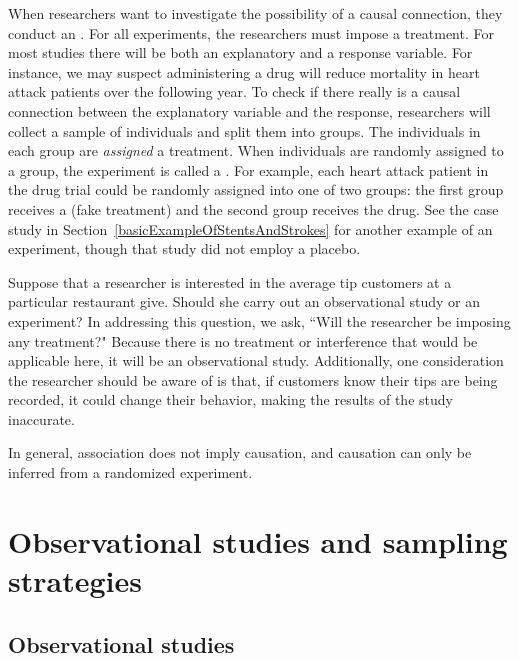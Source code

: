 When researchers want to investigate the possibility of a causal connection, they conduct an . For all experiments, the researchers must impose a treatment. For most studies there will be both an explanatory and a response variable. For instance, we may suspect administering a drug will reduce mortality in heart attack patients over the following year. To check if there really is a causal connection between the explanatory variable and the response, researchers will collect a sample of individuals and split them into groups. The individuals in each group are \emph{assigned} a treatment. When individuals are randomly assigned to a group, the experiment is called a . For example, each heart attack patient in the drug trial could be randomly assigned into one of two groups: the first group receives a  (fake treatment) and the second group receives the drug. See the case study in Section~\ref{basicExampleOfStentsAndStrokes} for another example of an experiment, though that study did not employ a placebo.

\begin{example}{Suppose that a researcher is interested in the average tip customers at a particular restaurant give. Should she carry out an observational study or an experiment?}
In addressing this question, we ask, ``Will the researcher be imposing any treatment?"  Because there is no treatment or interference that would be applicable here, it will be an observational study. Additionally, one consideration the researcher should be aware of is that, if customers know their tips are being recorded, it could change their behavior, making the results of the study inaccurate.
\end{example}

\begin{tipBox}{
In general, association does not imply causation, and causation can only be inferred from a randomized experiment.}
\end{tipBox}


\section[Observational studies and sampling strategies]{Observational studies and sampling strategies }

\subsection{Observational studies}


